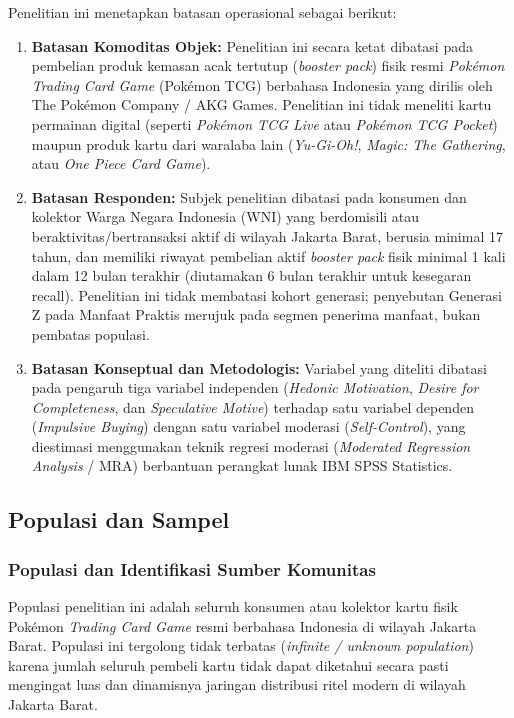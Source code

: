 \documentclass[12pt,a4paper]{article}
\numberwithin{equation}{section}
\numberwithin{table}{section}
\numberwithin{figure}{section}
\begin{document}
Penelitian ini menetapkan batasan operasional sebagai berikut:
\begin{enumerate}
  \item \textbf{Batasan Komoditas Objek:} Penelitian ini secara ketat dibatasi pada pembelian produk kemasan acak tertutup (\emph{booster pack}) fisik resmi \emph{Pok\'emon Trading Card Game} (Pok\'emon TCG) berbahasa Indonesia yang dirilis oleh The Pok\'emon Company / AKG Games. Penelitian ini tidak meneliti kartu permainan digital (seperti \emph{Pok\'emon TCG Live} atau \emph{Pok\'emon TCG Pocket}) maupun produk kartu dari waralaba lain (\emph{Yu-Gi-Oh!}, \emph{Magic: The Gathering}, atau \emph{One Piece Card Game}).
  \item \textbf{Batasan Responden:} Subjek penelitian dibatasi pada konsumen dan kolektor Warga Negara Indonesia (WNI) yang berdomisili atau beraktivitas/bertransaksi aktif di wilayah Jakarta Barat, berusia minimal 17 tahun, dan memiliki riwayat pembelian aktif \emph{booster pack} fisik minimal 1 kali dalam 12 bulan terakhir (diutamakan 6 bulan terakhir untuk kesegaran recall). Penelitian ini tidak membatasi kohort generasi; penyebutan Generasi Z pada Manfaat Praktis merujuk pada segmen penerima manfaat, bukan pembatas populasi.
  \item \textbf{Batasan Konseptual dan Metodologis:} Variabel yang diteliti dibatasi pada pengaruh tiga variabel independen (\emph{Hedonic Motivation}, \emph{Desire for Completeness}, dan \emph{Speculative Motive}) terhadap satu variabel dependen (\emph{Impulsive Buying}) dengan satu variabel moderasi (\emph{Self-Control}), yang diestimasi menggunakan teknik regresi moderasi (\emph{Moderated Regression Analysis} / MRA) berbantuan perangkat lunak IBM SPSS Statistics.
\end{enumerate}

\subsection{Populasi dan Sampel}

\subsubsection{Populasi dan Identifikasi Sumber Komunitas}

Populasi penelitian ini adalah seluruh konsumen atau kolektor kartu fisik Pok\'emon \emph{Trading Card Game} resmi berbahasa Indonesia di wilayah Jakarta Barat. Populasi ini tergolong tidak terbatas (\emph{infinite / unknown population}) karena jumlah seluruh pembeli kartu tidak dapat diketahui secara pasti mengingat luas dan dinamisnya jaringan distribusi ritel modern di wilayah Jakarta Barat.
\end{document}
